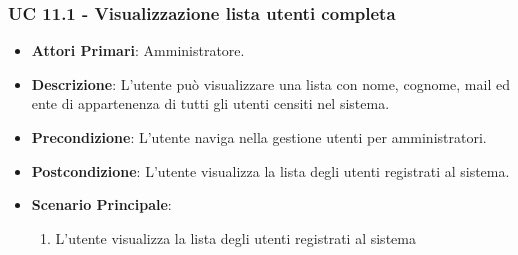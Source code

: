 			\subsubsection{UC 11.1 - Visualizzazione lista utenti completa}
			\begin{itemize}
				\item \textbf{Attori Primari}: Amministratore.
				\item \textbf{Descrizione}: L'utente può visualizzare una lista con nome, cognome, mail ed ente di appartenenza di tutti gli utenti censiti nel sistema.
				\item \textbf{Precondizione}: L'utente naviga nella gestione utenti per amministratori.
				\item \textbf{Postcondizione}: L'utente visualizza la lista degli utenti registrati al sistema.
				\item \textbf{Scenario Principale}:
				\begin{enumerate}
					\item{L'utente visualizza la lista degli utenti registrati al sistema}
				\end{enumerate}	
			\end{itemize}
			
